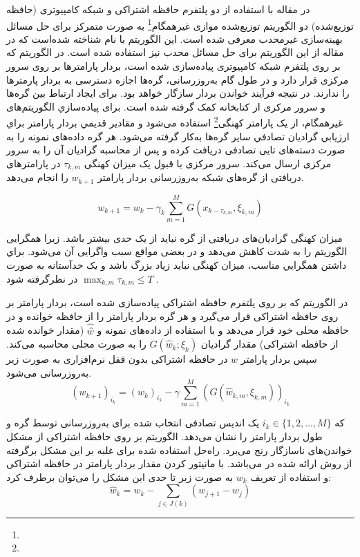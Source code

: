در مقاله \cite{lian2019} با استفاده از دو پلتفرم حافظه اشتراکی و شبکه کامپیوتری (حافظه توزیع‌شده) دو الگوریتم  توزیع‌شده موازی غیرهمگام\footnote{} به صورت متمرکز برای حل مسائل بهینه‌سازی غیرمحدب معرفی شده است. این الگوریتم با نام  شناخته شده‌است که در مقاله \cite{ag2011} از این الگوریتم برای حل مسائل محدب نیز استفاده شده است. در الگوریتم  \cite{lian2019} که بر روی پلتفرم شبکه‌ کامپیوتری پیاده‌سازی شده است، بردار پارامترها بر روی سرور مرکزی قرار دارد و در طول گام به‌روزرسانی، گره‌ها اجازه دسترسی به بردار پارمترها را ندارند. در نتیجه فرآیند خواندن بردار سازگار خواهد بود. برای ایجاد ارتباط بین گره‌ها و سرور مرکزی از کتابخانه  کمک گرفته شده است. برای پياده‌سازي الگوریتم‌های غيرهمگام، از یک پارامتر کهنگی\footnote{}  استفاده می‌شود و مقادير قديمي بردار پارامتر براي ارزيابي گراديان تصادفي سایر گره‌ها به‌کار گرفته می‌شود. هر گره داده‌های نمونه را به صورت دسته‌های تایی تصادفی دریافت کرده و پس از محاسبه گرادیان آن را به سرور مرکزی ارسال می‌کند. سرور مرکزی با قبول یک میزان کهنگی $\tau _{k,m}$ در پارامترهای دریافتی از گره‌های شبکه به‌روزرسانی بردار پارامتر $w_{k+1}$ را انجام می‌دهد. 

\begin{equation}\label{e23}
	w_{k+1}=w_k-{\gamma}_k \sum_{m=1}^{M}G(x_{k-\tau_{k,m}},\xi_{k,m})
\end{equation}

میزان کهنگی گرادیان‌های دریافتی از گره نباید از یک حدی بیشتر باشد. زیرا همگرایی الگوریتم را به شدت کاهش می‌دهد و در بعضی مواقع سبب واگرایی آن می‌شود. براي داشتن همگرايي مناسب، میزان کهنگی نبايد زياد بزرگ باشد و یک حدآستانه‌ به صورت $\max_{k,m} \tau _{k,m}\le T$ در نظرگرفته شود \cite{Avron2014}.

در الگوریتم  \cite{lian2019} که بر روی پلتفرم حافظه اشتراکی پیاده‌سازی شده است، بردار پارامتر  بر روی حافظه اشتراکی قرار می‌گیرد و هر گره بردار پارامتر را از حافظه خوانده و در حافظه محلی خود قرار می‌دهد و با استفاده از داده‌های نمونه و $\hat{w ̂}$ (مقدار خوانده شده از حافظه اشتراکی)  مقدار گرادیان $G(\hat{w}_k;\xi_k)$ را به صورت محلی محاسبه می‌کند. سپس بردار پارامتر $w$ در حافظه اشتراکی بدون قفل نرم‌افزاری به صورت زیر به‌روزرسانی می‌شود.
\begin{equation}\label{e24}
	(w_{k+1})_{i_k}=(w_k)_{i_k}-\gamma \sum_{m=1}^{M}(G(\hat{w}_{k,m},\xi_{k,m}))_{i_k} 
\end{equation}

که $i_k\in \{{1,2,…,M}\}$ یک اندیس تصادفی انتخاب شده برای به‌روزرسانی توسط گره  و  طول بردار پارامتر را نشان می‌دهد. الگوریتم  بر روی حافظه اشتراکی از مشکل خواندن‌های ناسازگار رنج می‌برد. راه‌حل استفاده شده برای غلبه بر این مشکل برگرفته از روش ارائه شده در \cite{Avron2014} می‌باشد. با مانیتور کردن مقدار بردار پارامتر در حافظه اشتراکی و استفاده از تعریف  $w_k$ به صورت زیر تا حدی این مشکل را می‌توان برطرف کرد:
\begin{equation}\label{e25}
	\hat{w}_k=w_k-\sum_{j\in J(k)} (w_{j+1}-w_j) 
\end{equation}

